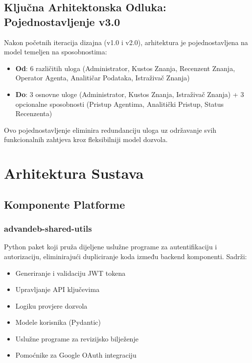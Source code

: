\documentclass[12pt,a4paper]{article}
\begin{document}
\subsection{Ključna Arhitektonska Odluka: Pojednostavljenje v3.0}
Nakon početnih iteracija dizajna (v1.0 i v2.0), arhitektura je pojednostavljena na model temeljen na sposobnostima:

\begin{itemize}[leftmargin=*]
    \item \textbf{Od}: 6 različitih uloga (Administrator, Kustos Znanja, Recenzent Znanja, Operator Agenta, Analitičar Podataka, Istraživač Znanja)
    \item \textbf{Do}: 3 osnovne uloge (Administrator, Kustos Znanja, Istraživač Znanja) + 3 opcionalne sposobnosti (Pristup Agentima, Analitički Pristup, Status Recenzenta)
\end{itemize}

Ovo pojednostavljenje eliminira redundanciju uloga uz održavanje svih funkcionalnih zahtjeva kroz fleksibilniji model dozvola.

\section{Arhitektura Sustava}

\subsection{Komponente Platforme}

\subsubsection{advandeb-shared-utils}
Python paket koji pruža dijeljene uslužne programe za autentifikaciju i autorizaciju, eliminirajući dupliciranje koda između backend komponenti. Sadrži:
\begin{itemize}
    \item Generiranje i validaciju JWT tokena
    \item Upravljanje API ključevima
    \item Logiku provjere dozvola
    \item Modele korisnika (Pydantic)
    \item Uslužne programe za revizijsko bilježenje
    \item Pomoćnike za Google OAuth integraciju
\end{itemize}
\end{document}
